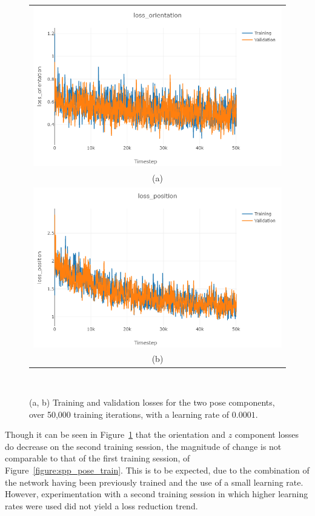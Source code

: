 \begin{figure}[!htbp]
  \centering
  \begin{tabular}{c}
    \includegraphics[width=.8\linewidth]{figures/spp/quant/pose/rot2.png}\\
    (a)\\
    \includegraphics[width=.8\linewidth]{figures/spp/quant/pose/pos2.png}\\
    (b)
  \end{tabular}
  \caption[VKITTI Pose Training]
  {
    (a, b) Training and validation losses for the two pose components, over 50,000 training 
    iterations, with a learning rate of \( 0.0001 \).
  }
~\label{figure:spp_pose_train2}
\end{figure}

Though it can be seen in Figure~\ref{figure:spp_pose_train2} that the orientation and \( z \) component losses do 
decrease on the second training session, the magnitude of change is not comparable to that of the first training session, 
of Figure~\ref{figure:spp_pose_train}. This is to be expected, due to the combination of the network having been 
previously trained and the use of a small learning rate. However, experimentation with a second training session in 
which higher learning rates were used did not yield a loss reduction trend.

